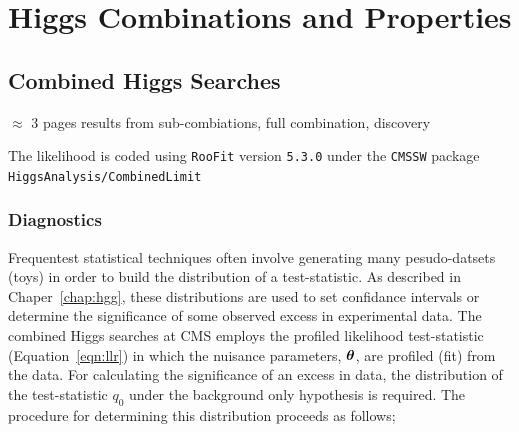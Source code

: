 \chapter{Higgs Combinations and Properties}
\label{chap:combinations}

\section{Combined Higgs Searches}
\label{sec:combinations}

$\approx$ 3 pages results from sub-combiations, full combination, discovery

The likelihood is coded using \texttt{RooFit} version \texttt{5.3.0} under the 
\texttt{CMSSW} package \\
\texttt{HiggsAnalysis/CombinedLimit}%

\subsection{Diagnostics}

Frequentest statistical techniques often involve generating many pesudo-datsets (toys)
in order to build the distribution of a test-statistic. As described in Chaper~\ref{chap:hgg},
these distributions are used to set confidance intervals or determine the significance of
some observed excess in experimental data. The combined Higgs searches at CMS employs the
profiled likelihood test-statistic (Equation~\ref{eqn:llr}) in which the nuisance parameters,
${\boldsymbol{\theta}}$, are profiled (fit) from the data. 
For calculating the significance of an excess in data, the distribution
of the test-statistic $q_{0}$ under the background only hypothesis is required. 
The procedure for determining this distribution proceeds as follows;

